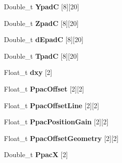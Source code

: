 \begin{DoxyCompactItemize}
\item 
\hypertarget{classAnalyzer_a192d58f713f39840b00a8eaad8d9d885}{
Double\_\-t {\bfseries YpadC} \mbox{[}8\mbox{]}\mbox{[}20\mbox{]}}
\label{classAnalyzer_a192d58f713f39840b00a8eaad8d9d885}

\item 
\hypertarget{classAnalyzer_a13efb26ee778b6385b7308c4926960ed}{
Double\_\-t {\bfseries ZpadC} \mbox{[}8\mbox{]}\mbox{[}20\mbox{]}}
\label{classAnalyzer_a13efb26ee778b6385b7308c4926960ed}

\item 
\hypertarget{classAnalyzer_a179bf02d3fbaa3150d3d19f203634cde}{
Double\_\-t {\bfseries dEpadC} \mbox{[}8\mbox{]}\mbox{[}20\mbox{]}}
\label{classAnalyzer_a179bf02d3fbaa3150d3d19f203634cde}

\item 
\hypertarget{classAnalyzer_a5f544616e0a4f2ec970cf6ab643f5730}{
Double\_\-t {\bfseries TpadC} \mbox{[}8\mbox{]}\mbox{[}20\mbox{]}}
\label{classAnalyzer_a5f544616e0a4f2ec970cf6ab643f5730}

\item 
\hypertarget{classAnalyzer_a415ca8660341be26b484e01df6888cd7}{
Float\_\-t {\bfseries dxy} \mbox{[}2\mbox{]}}
\label{classAnalyzer_a415ca8660341be26b484e01df6888cd7}

\item 
\hypertarget{classAnalyzer_a7cf050af0d74f3c43a137755d05b2996}{
Float\_\-t {\bfseries PpacOffset} \mbox{[}2\mbox{]}\mbox{[}2\mbox{]}}
\label{classAnalyzer_a7cf050af0d74f3c43a137755d05b2996}

\item 
\hypertarget{classAnalyzer_a39b19d0c00f295309390c63b0540eecd}{
Float\_\-t {\bfseries PpacOffsetLine} \mbox{[}2\mbox{]}\mbox{[}2\mbox{]}}
\label{classAnalyzer_a39b19d0c00f295309390c63b0540eecd}

\item 
\hypertarget{classAnalyzer_af6aca7aeec0490936c36ebfadf18d5af}{
Float\_\-t {\bfseries PpacPositionGain} \mbox{[}2\mbox{]}\mbox{[}2\mbox{]}}
\label{classAnalyzer_af6aca7aeec0490936c36ebfadf18d5af}

\item 
\hypertarget{classAnalyzer_a0f560c7b89a2fe50794878e1b53441fa}{
Float\_\-t {\bfseries PpacOffsetGeometry} \mbox{[}2\mbox{]}\mbox{[}2\mbox{]}}
\label{classAnalyzer_a0f560c7b89a2fe50794878e1b53441fa}

\item 
\hypertarget{classAnalyzer_a2812ca7df7ad49c641c08c5095146d69}{
Double\_\-t {\bfseries PpacX} \mbox{[}2\mbox{]}}
\label{classAnalyzer_a2812ca7df7ad49c641c08c5095146d69}


\end{DoxyCompactItemize}
